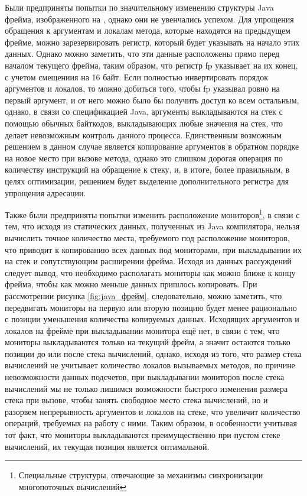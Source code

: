 
Были предприняты попытки по значительному изменению структуры Java фрейма, изображенного на , однако они не увенчались успехом. Для упрощения обращения к аргументам и локалам метода, которые находятся на предыдущем фрейме, можно зарезервировать регистр, который будет указывать на начало этих данных. Однако можно заметить, что эти данные расположены прямо перед началом текущего фрейма, таким образом, что регистр fp указывает на их конец, с учетом смещениия на 16 байт. Если полностью инвертировать порядок аргументов и локалов, то можно добиться того, чтобы fp указывал ровно на первый аргумент, и от него можно было бы получить доступ ко всем остальным, однако, в связи со спецификацией Java, аргументы выкладываются на стек с помощью обычных байткодов, выкладывающих любые значения на стек, что делает невозможным контроль данного процесса. Единственным возможным решением в данном случае является копирование аргументов в обратном порядке на новое место при вызове метода, однако это слишком дорогая операция по количеству инструкций на обращение к стеку, и, в итоге, более правильным, в целях оптимизации, решением будет выделение дополнительного регистра для упрощения адресации.

Также были предприняты попытки изменить расположение мониторов\footnote{Специальные структуры, отвечающие за механизмы синхронизации многопоточных вычислений}, в связи с тем, что исходя из статических данных, полученных из Java компилятора, нельзя вычислить точное количество места, требуемого под расположение мониторов, что приводит к копированию всех данных под мониторами, при выкладывании их на стек и сопутствующим расширении фрейма. Исходя из данных рассуждений следует вывод, что необходимо располагать мониторы как можно ближе к концу фрейма, чтобы как можно меньше данных пришлось копировать. При рассмотрении рисунка \ref{fig:java_фрейм}, следовательно, можно заметить, что передвигать мониторы на первую или вторую позицию будет менее рационально с позиции уменьшения количества копируемых данных. Исходящих аргументов и локалов на фрейме при выкладывании монитора ещё нет, в связи с тем, что мониторы выкладываются только на текущий фрейм, а значит остаются только позиции до или после стека вычислений, однако, исходя из того, что размер стека вычислений не учитывает количество локалов вызываемых методов, по причине невозможности данных подсчетов, при выкладывании мониторов после стека вычислений мы не только лишимся возможности быстрого изменения размера стека при вызове, чтобы занять свободное место стека вычислений, но и разорвем непрерывность аргументов и локалов на стеке, что увеличит количество операций, требуемых на работу с ними. Таким образом, в особенности учитывая тот факт, что мониторы выкладываются преимущественно при пустом стеке вычислений, их текущая позиция является оптимальной.



